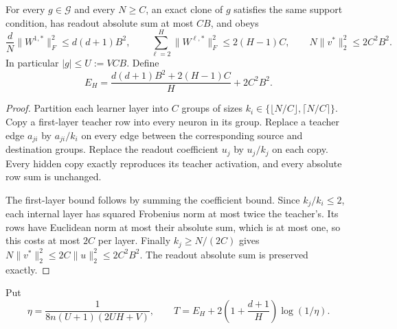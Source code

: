 \begin{lemma}
\label{lem:cloning}
For every $g\in\mathcal G$ and every $N\ge C$, an exact clone of $g$ satisfies the same support condition, has readout absolute sum at most $CB$, and obeys
\[
 \frac dN\|W^{1,*}\|_F^2\le d(d+1)B^2,\qquad
 \sum_{\ell=2}^H\|W^{\ell,*}\|_F^2\le2(H-1)C,\qquad
 N\|v^*\|_2^2\le2C^2B^2.
\]
In particular $|g|\le U:=VCB$. Define
\begin{equation}
 E_H=\frac{d(d+1)B^2+2(H-1)C}{H}+2C^2B^2.
 \label{eq:EH}
\end{equation}
\end{lemma}
\begin{proof}
Partition each learner layer into $C$ groups of sizes $k_i\in\{\lfloor N/C\rfloor,\lceil N/C\rceil\}$. Copy a first-layer teacher row into every neuron in its group. Replace a teacher edge $a_{ji}$ by $a_{ji}/k_i$ on every edge between the corresponding source and destination groups. Replace the readout coefficient $u_j$ by $u_j/k_j$ on each copy. Every hidden copy exactly reproduces its teacher activation, and every absolute row sum is unchanged.

The first-layer bound follows by summing the coefficient bound. Since $k_j/k_i\le2$, each internal layer has squared Frobenius norm at most twice the teacher's. Its rows have Euclidean norm at most their absolute sum, which is at most one, so this costs at most $2C$ per layer. Finally $k_j\ge N/(2C)$ gives $N\|v^*\|_2^2\le2C\|u\|_2^2\le2C^2B^2$. The readout absolute sum is preserved exactly.
\end{proof}

Put
\begin{equation}
 \eta=\frac1{8n(U+1)(2UH+V)},\qquad
 T=E_H+2\left(1+\frac{d+1}{H}\right)\log(1/\eta).
 \label{eq:T}
\end{equation}

